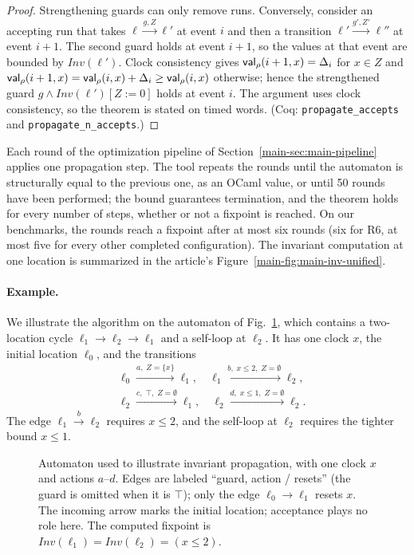 \begin{proof}
Strengthening guards can only remove runs.  Conversely, consider an accepting
run that takes $\ell\xrightarrow{g,Z}\ell'$ at event $i$ and then a transition
$\ell'\xrightarrow{g',Z'}\ell''$ at event $i+1$.  The second guard holds at event
$i+1$, so the values at that event are bounded by $\mathit{Inv}(\ell')$.  Clock
consistency gives $\mathsf{val}_\rho(i+1,x)=\Delta_i$ for $x\in Z$ and
$\mathsf{val}_\rho(i+1,x)=\mathsf{val}_\rho(i,x)+\Delta_i\ge\mathsf{val}_\rho(i,x)$ otherwise; hence
the strengthened guard $g\wedge\mathit{Inv}(\ell')[Z:=0]$ holds at event $i$.
The argument uses clock consistency, so the theorem is stated on timed words.
(Coq: \texttt{propagate\_\allowbreak{}accepts} and
\texttt{propagate\_\allowbreak{}n\_\allowbreak{}accepts}.)
\end{proof}

Each round of the optimization pipeline of Section~\ref{main-sec:main-pipeline}
applies one propagation step.  The tool repeats the rounds until the
automaton is structurally equal to the previous one, as an OCaml value, or
until 50 rounds have been performed; the bound guarantees termination, and the
theorem holds for every number of steps, whether or not a fixpoint is
reached.  On our benchmarks, the rounds reach a fixpoint after at most six
rounds (six for R6, at most five for every other completed configuration).
The invariant computation at one location is summarized in the article's
Figure~\ref{main-fig:main-inv-unified}.

\paragraph{Example.}
We illustrate the algorithm on the automaton of Fig.~\ref{fig:inv-example},
which contains a two-location cycle $\ell_1\to\ell_2\to\ell_1$ and a self-loop
at $\ell_2$.  It has one clock $x$, the initial location $\ell_0$, and the
transitions
\[
\begin{aligned}
&\ell_0 \xrightarrow{a,\;Z=\{x\}} \ell_1,\quad
 \ell_1 \xrightarrow{b,\;x\le 2,\;Z=\emptyset} \ell_2,\\
&\ell_2 \xrightarrow{c,\;\top,\;Z=\emptyset} \ell_1,\quad
 \ell_2 \xrightarrow{d,\;x\le 1,\;Z=\emptyset} \ell_2.
\end{aligned}
\]
The edge $\ell_1\xrightarrow{b}\ell_2$ requires $x\le2$, and the self-loop at
$\ell_2$ requires the tighter bound $x\le1$.

\begin{figure}[t]
\centering

\caption{Automaton used to illustrate invariant propagation, with one clock $x$
and actions $a$--$d$.  Edges are labeled ``guard, action / resets'' (the guard
is omitted when it is $\top$); only the edge $\ell_0\to\ell_1$ resets $x$.  The
incoming arrow marks the initial location; acceptance plays no role here.  The
computed fixpoint is $\mathit{Inv}(\ell_1)=\mathit{Inv}(\ell_2)=(x\le2)$.}
\label{fig:inv-example}
\end{figure}


